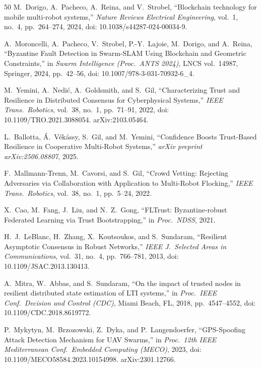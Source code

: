 \documentclass[conference,10pt]{IEEEtran}
\begin{document}
\begin{thebibliography}{50}
M.~Dorigo, A.~Pacheco, A.~Reina, and V.~Strobel,
``Blockchain technology for mobile multi-robot systems,''
\emph{Nature Reviews Electrical Engineering}, vol.~1, no.~4, pp.~264--274, 2024,
doi: 10.1038/s44287-024-00034-9.

A.~Moroncelli, A.~Pacheco, V.~Strobel, P.-Y.~Lajoie, M.~Dorigo, and A.~Reina,
``Byzantine Fault Detection in Swarm-SLAM Using Blockchain and Geometric Constraints,''
in \emph{Swarm Intelligence (Proc.\ ANTS 2024)}, LNCS vol.~14987, Springer, 2024, pp.~42--56,
doi: 10.1007/978-3-031-70932-6\_4.

M.~Yemini, A.~Nedić, A.~Goldsmith, and S.~Gil,
``Characterizing Trust and Resilience in Distributed Consensus for Cyberphysical Systems,''
\emph{IEEE Trans.\ Robotics}, vol.~38, no.~1, pp.~71--91, 2022,
doi: 10.1109/TRO.2021.3088054. arXiv:2103.05464.

L.~Ballotta, Á.~Vékássy, S.~Gil, and M.~Yemini,
``Confidence Boosts Trust-Based Resilience in Cooperative Multi-Robot Systems,''
\emph{arXiv preprint arXiv:2506.08807}, 2025.

F.~Mallmann-Trenn, M.~Cavorsi, and S.~Gil,
``Crowd Vetting: Rejecting Adversaries via Collaboration with Application to Multi-Robot Flocking,''
\emph{IEEE Trans.\ Robotics}, vol.~38, no.~1, pp.~5--24, 2022.

X.~Cao, M.~Fang, J.~Liu, and N.~Z.~Gong,
``FLTrust: Byzantine-robust Federated Learning via Trust Bootstrapping,''
in \emph{Proc.\ NDSS}, 2021.

H.~J.~LeBlanc, H.~Zhang, X.~Koutsoukos, and S.~Sundaram,
``Resilient Asymptotic Consensus in Robust Networks,''
\emph{IEEE J.\ Selected Areas in Communications}, vol.~31, no.~4, pp.~766--781, 2013,
doi: 10.1109/JSAC.2013.130413.

A.~Mitra, W.~Abbas, and S.~Sundaram,
``On the impact of trusted nodes in resilient distributed state estimation of LTI systems,''
in \emph{Proc.\ IEEE Conf.\ Decision and Control (CDC)}, Miami Beach, FL, 2018, pp.~4547--4552,
doi: 10.1109/CDC.2018.8619772.

P.~Mykytyn, M.~Brzozowski, Z.~Dyka, and P.~Langendoerfer,
``GPS-Spoofing Attack Detection Mechanism for UAV Swarms,''
in \emph{Proc.\ 12th IEEE Mediterranean Conf.\ Embedded Computing (MECO)}, 2023,
doi: 10.1109/MECO58584.2023.10154998. arXiv:2301.12766.


\end{thebibliography}
\end{document}
